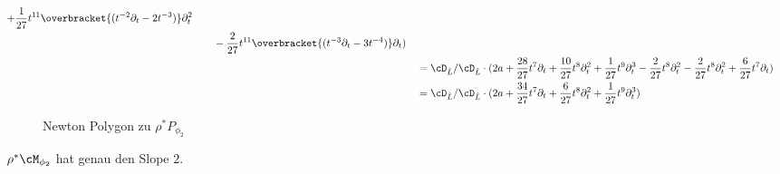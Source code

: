 \begin{align*}
\begin{aligned}
    +\frac{1}{27}t^{11}\overbracket{(t^{-2}\partial_t-2t^{-3})}\partial_t^2\\
    &\qquad-\frac{2}{27}t^{11}\overbracket{(t^{-3}\partial_t-3t^{-4})}
      \partial_t
  )
\end{aligned}\\
&= \cD_{\hat L}/\cD_{\hat L}\cdot(2a+
  \frac{28}{27}t^7\partial_t
  +\frac{10}{27}t^{8}\partial_t^2
  +\frac{1}{27}t^{9}\partial_t^3-\frac{2}{27}t^{8}\partial_t^2
  -\frac{2}{27}t^{8}\partial_t^2 +\frac{6}{27}t^{7}\partial_t
)\\
&= \cD_{\hat L}/\cD_{\hat L}\cdot(2a+ \frac{34}{27}t^7\partial_t
  +\frac{6}{27}t^{8}\partial_t^2 +\frac{1}{27}t^{9}\partial_t^3)
\end{align*}
\begin{figure}[H]
\caption{Newton Polygon zu $\rho^*P_{\phi_2}$}
\begin{center}
\end{center}
\end{figure}
$\rho^*\cM_{\phi_2}$ hat genau den Slope $2$.

